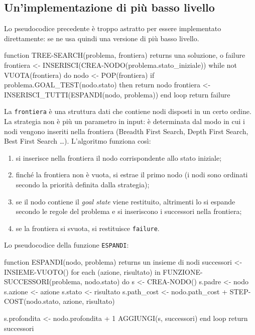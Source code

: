 \documentclass[a4paper, 11pt, oneside]{book}
\theoremstyle{definition}
\begin{document}
	\subsection{Un'implementazione di pi\`u basso livello}

	Lo pseudocodice precedente \`e troppo astratto per essere implementato direttamente:
	se ne usa quindi una versione di pi\`u basso livello.

\begin{codice}
function TREE-SEARCH(problema, frontiera) returns una soluzione, o failure
    frontiera <- INSERISCI(CREA-NODO(problema.stato_iniziale))
    while not VUOTA(frontiera) do
        nodo <- POP(frontiera)
        if problema.GOAL_TEST(nodo.stato) then return nodo
        frontiera <- INSERISCI_TUTTI(ESPANDI(nodo, problema))
    end loop
    return failure
\end{codice}

	La \texttt{frontiera} \`e una struttura dati che contiene nodi disposti in un certo
	ordine. La strategia non \`e pi\`u un parametro in input: \`e determinata dal modo in cui
	i nodi vengono inseriti nella frontiera (Breadth First Search, Depth First Search,
	Best First Search \dots). L'algoritmo funziona cos\`i:
	\begin{enumerate}
		\item si inserisce nella frontiera il nodo corrispondente allo stato iniziale;
		\item finch\'e la frontiera non \`e vuota, si estrae il primo nodo (i nodi sono
			ordinati secondo la priorit\`a definita dalla strategia);
		\item se il nodo contiene il \emph{goal state} viene restituito, altrimenti lo si
			espande secondo le regole del problema e si inseriscono i successori nella
			frontiera;
		\item se la frontiera si svuota, si restituisce \texttt{failure}.
	\end{enumerate}

	Lo pseudocodice della funzione \texttt{ESPANDI}:

\begin{codice}
function ESPANDI(nodo, problema) returns un insieme di nodi
    successori <- INSIEME-VUOTO()
    for each (azione, risultato) in FUNZIONE-SUCCESSORI(problema, nodo.stato) do
        s <- CREA-NODO()
        s.padre <- nodo
        s.azione <- azione
        s.stato <- risultato
        s.path_cost <- nodo.path_cost + 
                                    STEP-COST(nodo.stato, azione, risultato)

        s.profondita <- nodo.profondita + 1
        AGGIUNGI(s, successori)
    end loop
    return successori
\end{codice}
\end{document}
